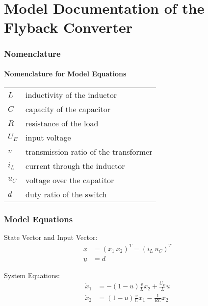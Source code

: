 \documentclass[10pt,a4paper]{article}
\begin{document}
	\part*{Model Documentation of the \\ Flyback Converter} %
	
	
	\section{Nomenclature} %
	\subsection{Nomenclature for Model Equations} %
	
	\begin{tabular}{ll}
		$L$ & inductivity of the inductor \\
		$C$ & capacity of the capacitor \\
		$R$ & resistance of the load \\
		$U_E$ & input voltage \\
		$v$ & transmission ratio of the transformer \\
		$i_L$ & current through the inductor \\
		$u_C$ & voltage over the capatitor \\
		$d$ & duty ratio of the switch \\

		
				
	\end{tabular}
	 
	
	
	\section{Model Equations} %
	
	State Vector and Input Vector:
	\begin{align*}
		\underline{x} &= (x_1 \ x_2)^T = (i_L \ u_C)^T \\
		\underline{u} &= d
	\end{align*}
	
	\noindent System Equations:			
	\begin{subequations}
	\begin{align}
		\dot{x}_1 &= -(1-u)\frac{v}{L}x_2 + \frac{U_E}{L}u \\
		\dot{x}_2 &= (1-u)\frac{v}{C}x_1 - \frac{1}{RC}x_2
	\end{align}
	\end{subequations}
\end{document}
